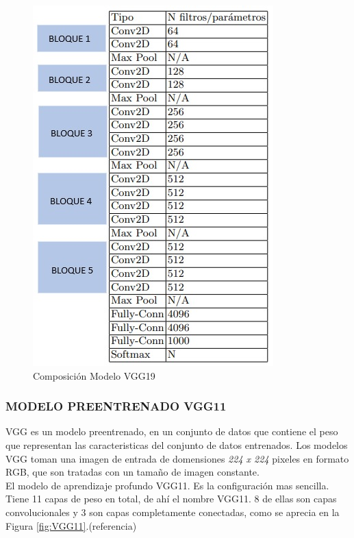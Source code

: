 				\begin{figure}[ht]
					\centering
					\includegraphics[scale=0.55]{Figs/21.jpeg}
					\caption{Composición Modelo VGG19}
					\label{fig:VGG19_tabla}
				\end{figure}

\newpage
			\subsubsection{\MakeUppercase{Modelo preentrenado VGG11}}
			VGG es un modelo preentrenado, en un conjunto de datos que contiene el peso que representan las caracteristicas del conjunto de datos entrenados. Los modelos VGG toman una imagen de entrada de domensiones \textit{224 x 224} pixeles en formato RGB, que son tratadas con un tamaño de imagen constante.
			\\
			 El modelo de aprendizaje profundo VGG11. Es la configuración mas sencilla. Tiene 11 capas de peso en total, de ahí el nombre VGG11. 8 de ellas son capas convolucionales y 3 son capas completamente conectadas, como se aprecia en la Figura \ref{fig:VGG11}.(referencia)
			
